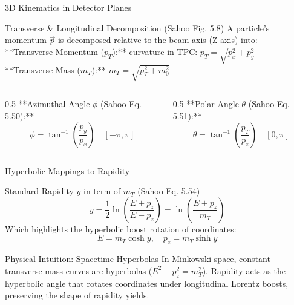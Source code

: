 \documentclass[aspectratio=169]{beamer}
\begin{document}
\begin{frame}{3D Kinematics in Detector Planes}
    \begin{block}{Transverse \& Longitudinal Decomposition (Sahoo Fig. 5.8)}
        A particle's momentum $\vec{p}$ is decomposed relative to the beam axis (Z-axis) into:
        - **Transverse Momentum ($p_T$):** curvature in TPC: $p_T = \sqrt{p_x^2 + p_y^2}$
        - **Transverse Mass ($m_T$):** $m_T = \sqrt{p_T^2 + m_0^2}$
    \end{block}
    \begin{columns}
        \begin{column}{0.5\textwidth}
            \footnotesize
            **Azimuthal Angle $\phi$ (Sahoo Eq. 5.50):**
            \[ \phi = \tan^{-1} \left( \frac{p_y}{p_x} \right) \quad [-\pi, \pi] \]
        \end{column}
        \begin{column}{0.5\textwidth}
            \footnotesize
            **Polar Angle $\theta$ (Sahoo Eq. 5.51):**
            \[ \theta = \tan^{-1} \left( \frac{p_T}{p_z} \right) \quad [0, \pi] \]
        \end{column}
    \end{columns}
\end{frame}

\begin{frame}{Hyperbolic Mappings to Rapidity}
    \begin{block}{Standard Rapidity $y$ in term of $m_T$ (Sahoo Eq. 5.54)}
        \[ y = \frac{1}{2} \ln \left( \frac{E+p_z}{E-p_z} \right) = \ln \left( \frac{E + p_z}{m_T} \right) \]
        Which highlights the hyperbolic boost rotation of coordinates:
        \[ E = m_T \cosh y, \quad p_z = m_T \sinh y \]
    \end{block}
    \begin{block}{Physical Intuition: Spacetime Hyperbolas}
        In Minkowski space, constant transverse mass curves are hyperbolas ($E^2 - p_z^2 = m_T^2$). Rapidity acts as the hyperbolic angle that rotates coordinates under longitudinal Lorentz boosts, preserving the shape of rapidity yields.
    \end{block}
\end{frame}
\end{document}
